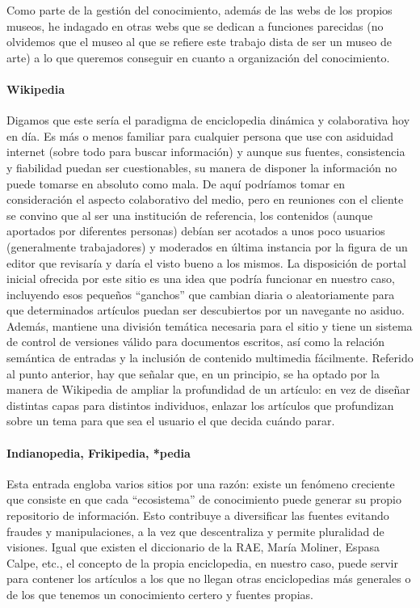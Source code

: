 \par Como parte de la gestión del conocimiento, además de las webs de los propios museos, he indagado en otras webs que se dedican a funciones parecidas (no olvidemos que el museo al que se refiere este trabajo dista de ser un museo de arte) a lo que queremos conseguir en cuanto a organización del conocimiento.

\paragraph{Wikipedia}
\par Digamos que este sería el paradigma de enciclopedia dinámica y colaborativa hoy en día. Es más o menos familiar para cualquier persona que use con asiduidad internet (sobre todo para buscar información) y aunque sus fuentes, consistencia y fiabilidad puedan ser cuestionables, su manera de disponer la información no puede tomarse en absoluto como mala. De aquí podríamos tomar en consideración el aspecto colaborativo del medio, pero en reuniones con el cliente se convino que al ser una institución de referencia, los contenidos (aunque aportados por diferentes personas) debían ser acotados a unos poco usuarios (generalmente trabajadores) y moderados en última instancia por la figura de un editor que revisaría y daría el visto bueno a los mismos.
La disposición de portal inicial ofrecida por este sitio es una idea que podría funcionar en nuestro caso, incluyendo esos pequeños ``ganchos'' que cambian diaria o aleatoriamente para que determinados artículos puedan ser descubiertos por un navegante no asiduo. Además, mantiene una división temática necesaria para el sitio y tiene un sistema de control de versiones válido para documentos escritos, así como la relación semántica de entradas y la inclusión de contenido multimedia fácilmente.
Referido al punto anterior, hay que señalar que, en un principio, se ha optado por la manera de Wikipedia de ampliar la profundidad de un artículo: en vez de diseñar distintas capas para distintos individuos, enlazar los artículos que profundizan sobre un tema para que sea el usuario el que decida cuándo parar.


\paragraph{Indianopedia, Frikipedia, *pedia}
\par Esta entrada engloba varios sitios por una razón: existe un fenómeno creciente que consiste en que cada ``ecosistema'' de conocimiento puede generar su propio repositorio de información. Esto contribuye a diversificar las fuentes evitando fraudes y manipulaciones, a la vez que descentraliza y permite pluralidad de visiones. Igual que existen el diccionario de la RAE, María Moliner, Espasa Calpe, etc., el concepto de la propia enciclopedia, en nuestro caso, puede servir para contener los artículos a los que no llegan otras enciclopedias más generales o de los que tenemos un conocimiento certero y fuentes propias.

